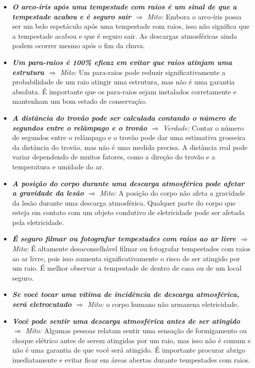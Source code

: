 \documentclass[a4paper, 12pt, onecolumn,singlespacing]{article}
\begin{document}
\begin{itemize}
		\item \textbf{\textit{O arco-íris após uma tempestade com raios é um sinal de que a tempestade acabou e é seguro sair $\Rightarrow$}}
		\textit{Mito:} Embora o arco-íris possa ser um belo espetáculo após uma tempestade com raios, isso não significa que a tempestade acabou e que é seguro sair. As descargas atmosféricas ainda podem ocorrer mesmo após o fim da chuva.
		
		\item \textbf{\textit{Um para-raios é 100\% eficaz em evitar que raios atinjam uma estrutura $\Rightarrow$}}
		\textit{Mito:} Um para-raios pode reduzir significativamente a probabilidade de um raio atingir uma estrutura, mas não é uma garantia absoluta. É importante que os para-raios sejam instalados corretamente e mantenham um bom estado de conservação.
		
		\item \textbf{\textit{A distância do trovão pode ser calculada contando o número de segundos entre o relâmpago e o trovão $\Rightarrow$}}	\textit{Verdade: }Contar o número de segundos entre o relâmpago e o trovão pode dar uma estimativa grosseira da distância do trovão, mas não é uma medida precisa. A distância real pode variar dependendo de muitos fatores, como a direção do trovão e a temperatura e umidade do ar.
		
		\item \textbf{\textit{A posição do corpo durante uma descarga atmosférica pode afetar a gravidade da lesão $\Rightarrow$}}
		\textit{Mito: }A posição do corpo não afeta a gravidade da lesão durante uma descarga atmosférica. Qualquer parte do corpo que esteja em contato com um objeto condutivo de eletricidade pode ser afetada pela eletricidade.
		
		\item \textbf{\textit{É seguro filmar ou fotografar tempestades com raios ao ar livre $\Rightarrow$}}
		\textit{Mito: }É altamente desaconselhável filmar ou fotografar tempestades com raios ao ar livre, pois isso aumenta significativamente o risco de ser atingido por um raio. É melhor observar a tempestade de dentro de casa ou de um local seguro.
		
		\item \textbf{\textit{Se você tocar uma vítima de incidência de descarga atmosférica, será eletrocutado $\Rightarrow$}} \textit{Mito:} o corpo humano não armazena eletricidade.
		\item \textbf{\textit{Você pode sentir uma descarga atmosférica antes de ser atingido $\Rightarrow$}} \textit{Mito:} Algumas pessoas relatam sentir uma sensação de formigamento ou choque elétrico antes de serem atingidas por um raio, mas isso não é comum e não é uma garantia de que você será atingido. É importante procurar abrigo imediatamente e evitar ficar em áreas abertas durante tempestades com raios.
	\end{itemize}
\end{document}
